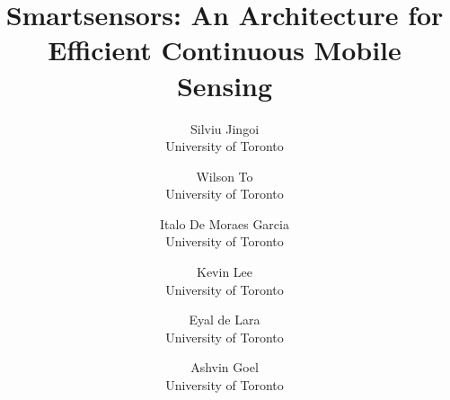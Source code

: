 \documentclass[letterpaper,twocolumn,10pt]{article}
\begin{document}
\date{}


\title{\Large \bf Smartsensors: An Architecture for Efficient
  Continuous Mobile Sensing}

\author{
{\rm Silviu Jingoi}\\
University of Toronto
\and
{\rm Wilson To}\\
University of Toronto
\and
{\rm Italo De Moraes Garcia}\\
University of Toronto
\and
{\rm Kevin Lee}\\
University of Toronto
\and
{\rm Eyal de Lara}\\
University of Toronto
\and
{\rm Ashvin Goel}\\
University of Toronto
} %

\maketitle















{\footnotesize 
}
\end{document}

